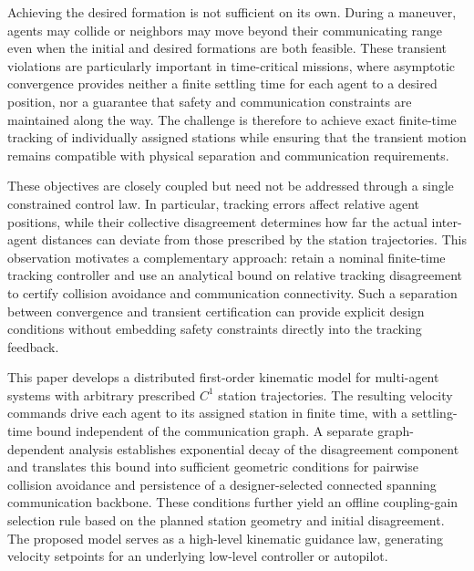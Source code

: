 \documentclass[letterpaper,10pt,conference]{ieeeconf}
\begin{document}
Achieving the desired formation is not sufficient on its own. During a maneuver, agents may collide or  neighbors may move beyond their communicating range even when the initial and desired formations are both feasible. These transient violations are particularly important in time-critical missions, where asymptotic convergence provides neither a finite settling time for each agent to a desired position, nor a guarantee that safety and communication constraints are maintained along the way. The challenge is therefore to achieve exact finite-time tracking of individually assigned stations while ensuring that the transient motion remains compatible with physical separation and communication requirements.

These objectives are closely coupled but need not be addressed through a single constrained control law. In particular, tracking errors affect relative agent positions, while their collective disagreement determines how far the actual inter-agent distances can deviate from those prescribed by the station trajectories. This observation motivates a complementary approach: retain a nominal finite-time tracking controller and use an analytical bound on relative tracking disagreement to certify collision avoidance and communication connectivity. Such a separation between convergence and transient certification can provide explicit design conditions without embedding safety constraints directly into the tracking feedback.

This paper develops a distributed first-order kinematic model for multi-agent systems with arbitrary prescribed $C^1$ station trajectories. The resulting velocity commands drive each agent to its assigned station in finite time, with a settling-time bound independent of the communication graph. A separate graph-dependent analysis establishes exponential decay of the disagreement component and translates this bound into sufficient geometric conditions for pairwise collision avoidance and persistence of a designer-selected connected spanning communication backbone. These conditions further yield an offline coupling-gain selection rule based on the planned station geometry and initial disagreement. The proposed model serves as a high-level kinematic guidance law, generating velocity setpoints for an underlying low-level controller or autopilot.
\end{document}

